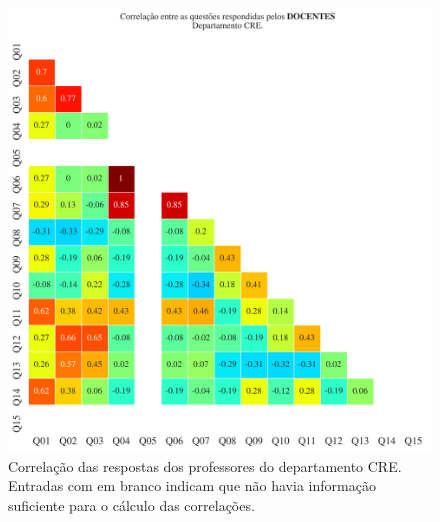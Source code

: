 \documentclass[a4paper,10pt]{article}
\begin{document}
\begin{figure}[h]
\centering
\includegraphics[width=0.999\linewidth]{matriz_corr__CRE_docentes.png}
\caption{\label{fig:corr_docentes}Correlação das respostas dos professores do departamento CRE. Entradas com em branco indicam que não havia informação suficiente para o cálculo das correlações.}
\end{figure}
\end{document}
